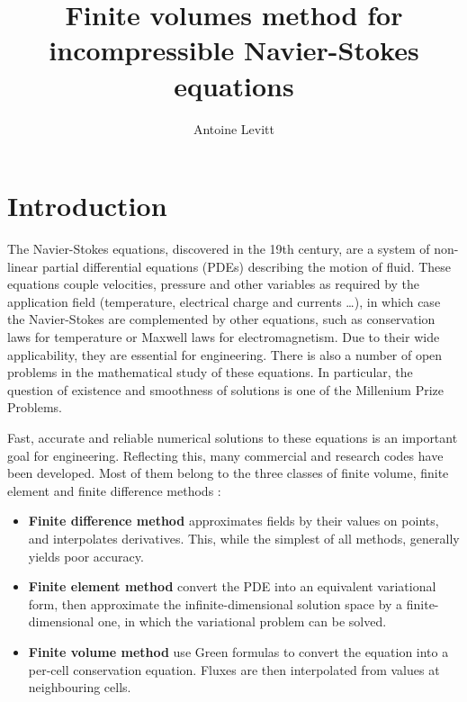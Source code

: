 \documentclass[12pt]{article}
\begin{document}
\author{Antoine Levitt}
\title{Finite volumes method for incompressible Navier-Stokes equations}
\maketitle
{}
\tableofcontents
\newpage

\section{Introduction}
The Navier-Stokes equations, discovered in the 19th century, are a
system of non-linear partial differential equations (PDEs) describing
the motion of fluid. These equations couple velocities, pressure and
other variables as required by the application field (temperature,
electrical charge and currents \dots), in which case the Navier-Stokes
are complemented by other equations, such as conservation laws for
temperature or Maxwell laws for electromagnetism. Due to their wide
applicability, they are essential for engineering. There is also a
number of open problems in the mathematical study of these
equations. In particular, the question of existence and smoothness of
solutions is one of the Millenium Prize Problems.

Fast, accurate and reliable numerical solutions to these equations is
an important goal for engineering. Reflecting this, many commercial
and research codes have been developed. Most of them belong to the
three classes of finite volume, finite element and finite difference
methods :

\begin{itemize}
\item {\bf Finite difference method} approximates fields by their
  values on points, and interpolates derivatives. This, while the
  simplest of all methods, generally yields poor accuracy.

\item {\bf Finite element method} convert the PDE into an equivalent
  variational form, then approximate the infinite-dimensional solution
  space by a finite-dimensional one, in which the variational problem
  can be solved.

\item {\bf Finite volume method} use Green formulas to convert the
  equation into a per-cell conservation equation. Fluxes are then
  interpolated from values at neighbouring cells.
\end{itemize}
\end{document}

